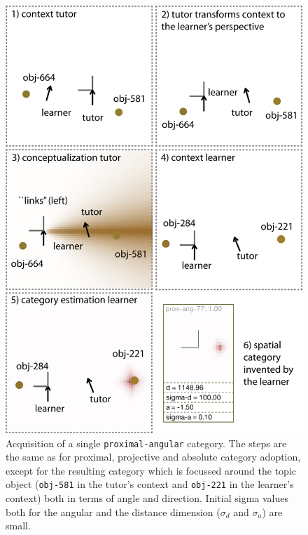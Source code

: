 \begin{figure}
\begin{center}
\includegraphics[width=0.8\columnwidth]{figs/category-acquisition-proximal-angular-single-category-acquisition.png}
\end{center}
\caption[Acquisition of a single {\footnotesize\tt proximal-angular} category]{Acquisition of a single {\footnotesize\tt proximal-angular} category. The steps are the same 
as for proximal, projective and absolute category adoption, except for the resulting category 
which is focussed around the topic object ({\footnotesize\tt obj-581} in the tutor's context and
{\footnotesize\tt obj-221} in the learner's context) both in terms of angle and direction.
Initial sigma values both for the angular and the distance dimension 
($\sigma_d$ and $\sigma_a$) are small.}
\label{f:category-acquisition-proximal-angular-single-category-acquisition}
\end{figure}

